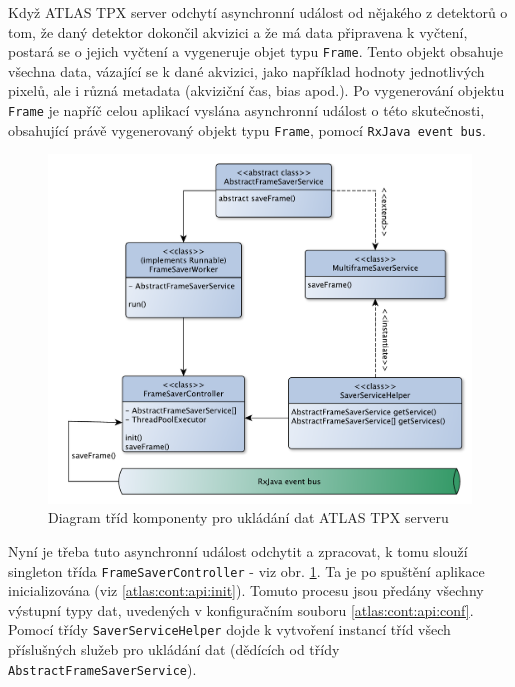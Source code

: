 Když ATLAS TPX server odchytí asynchronní událost od nějakého z detektorů o tom, že daný detektor dokončil akvizici a že má data připravena k vyčtení, postará se o jejich vyčtení a vygeneruje objet typu \texttt{Frame}. Tento objekt obsahuje všechna data, vázající se k dané akvizici, jako například hodnoty jednotlivých pixelů, ale i různá metadata (akviziční čas, bias apod.). Po vygenerování objektu \texttt{Frame} je napříč celou aplikací vyslána asynchronní událost o této skutečnosti, obsahující právě vygenerovaný objekt typu \texttt{Frame}, pomocí \texttt{RxJava event bus}.

\begin{figure}[t]
	\begin{center}
		\includegraphics[width=15cm]{figures/atlas_tpx_saver_service.pdf}
		\caption{Diagram tříd komponenty pro ukládání dat ATLAS TPX serveru}
		\label{fig:atlas:saver-service}
	\end{center}
\end{figure}

Nyní je třeba tuto asynchronní událost odchytit a zpracovat, k tomu slouží singleton třída \texttt{FrameSaverController} - viz obr. \ref{fig:atlas:saver-service}. Ta je po spuštění aplikace inicializována (viz \ref{atlas:cont:api:init}). Tomuto procesu jsou předány všechny výstupní typy dat, uvedených v konfiguračním souboru \ref{atlas:cont:api:conf}. Pomocí třídy \texttt{SaverServiceHelper} dojde k vytvoření instancí tříd všech příslušných služeb pro ukládání dat (dědících od třídy \texttt{AbstractFrameSaverService}).

